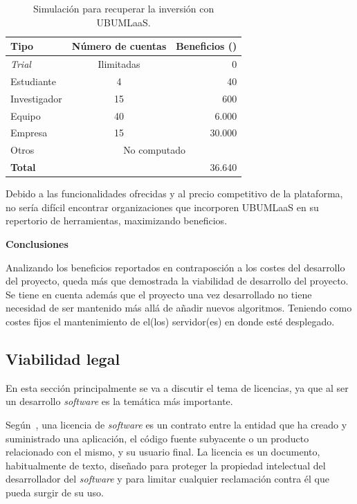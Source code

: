 \begin{table}[H]
\centering
\begin{tabular}{lcr}
	\toprule
	\textbf{Tipo}     & \textbf{Número de cuentas} & \textbf{Beneficios (\officialeuro)}\\
	\midrule
	\textit{Trial}        & Ilimitadas & 0 \\
	Estudiante   & 4 & 40 \\
	Investigador  & 15 & 600 \\
	Equipo  & 40 & 6.000 \\
	Empresa & 15 & 30.000 \\
	Otros & \multicolumn{2}{c}{No computado} \\
	\midrule
	\textbf{Total} &&36.640 \\
	\bottomrule
\end{tabular}
\caption{Simulación para recuperar la inversión con UBUMLaaS.}\label{tab:simulacion-clientes}
\end{table}

Debido a las funcionalidades ofrecidas y al precio competitivo de la plataforma, no sería difícil encontrar organizaciones que incorporen UBUMLaaS en su repertorio de herramientas, maximizando beneficios.

\textbf{Conclusiones}

Analizando los beneficios reportados en contraposción a los costes del desarrollo del proyecto, queda más que demostrada la viabilidad de desarrollo del proyecto. Se tiene en cuenta además que el proyecto una vez desarrollado no tiene necesidad de ser mantenido más allá de añadir nuevos algoritmos. Teniendo como costes fijos el mantenimiento de el(los) servidor(es) en donde esté desplegado.

\subsection{Viabilidad legal}

En esta sección principalmente se va a discutir el tema de licencias, ya que al ser un desarrollo \textit{software} es la temática más importante.

Según~\cite{softwareLicense}, una licencia de \textit{software} es un contrato entre la entidad que ha creado y suministrado una aplicación, el código fuente subyacente o un producto relacionado con el mismo, y su usuario final.  La licencia es un documento, habitualmente de texto, diseñado para proteger la propiedad intelectual del desarrollador del \textit{software} y para limitar cualquier reclamación contra él que pueda surgir de su uso.

